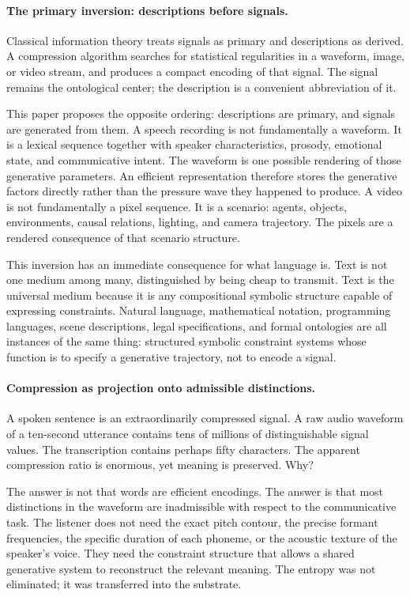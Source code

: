 \documentclass[12pt,a4paper]{article}
\begin{document}
\paragraph{The primary inversion: descriptions before signals.}
Classical information theory treats signals as primary and descriptions as derived. A compression algorithm searches for statistical regularities in a waveform, image, or video stream, and produces a compact encoding of that signal. The signal remains the ontological center; the description is a convenient abbreviation of it.

This paper proposes the opposite ordering: descriptions are primary, and signals are generated from them. A speech recording is not fundamentally a waveform. It is a lexical sequence together with speaker characteristics, prosody, emotional state, and communicative intent. The waveform is one possible rendering of those generative parameters. An efficient representation therefore stores the generative factors directly rather than the pressure wave they happened to produce. A video is not fundamentally a pixel sequence. It is a scenario: agents, objects, environments, causal relations, lighting, and camera trajectory. The pixels are a rendered consequence of that scenario structure.

This inversion has an immediate consequence for what language is. Text is not one medium among many, distinguished by being cheap to transmit. Text is the universal medium because it is any compositional symbolic structure capable of expressing constraints. Natural language, mathematical notation, programming languages, scene descriptions, legal specifications, and formal ontologies are all instances of the same thing: structured symbolic constraint systems whose function is to specify a generative trajectory, not to encode a signal.

\paragraph{Compression as projection onto admissible distinctions.}
A spoken sentence is an extraordinarily compressed signal. A raw audio waveform of a ten-second utterance contains tens of millions of distinguishable signal values. The transcription contains perhaps fifty characters. The apparent compression ratio is enormous, yet meaning is preserved. Why?

The answer is not that words are efficient encodings. The answer is that most distinctions in the waveform are inadmissible with respect to the communicative task. The listener does not need the exact pitch contour, the precise formant frequencies, the specific duration of each phoneme, or the acoustic texture of the speaker's voice. They need the constraint structure that allows a shared generative system to reconstruct the relevant meaning. The entropy was not eliminated; it was transferred into the substrate.
\end{document}
